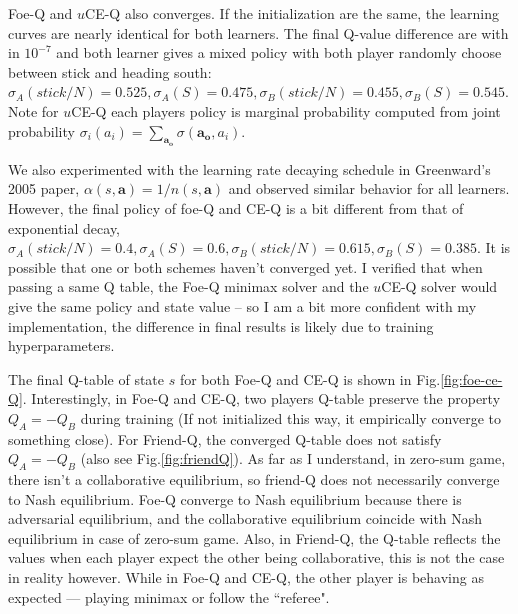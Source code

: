 \documentclass[conference]{IEEEtran}
\begin{document}
Foe-Q and $u$CE-Q also converges. If the initialization are the same, the learning curves are nearly identical for both learners. The final Q-value difference are with in $10^{-7}$ and both learner gives a mixed policy with both player randomly choose between stick and heading south: $\sigma_A(stick/N)=0.525, \sigma_A(S)=0.475, \sigma_B(stick/N)=0.455, \sigma_B(S)=0.545$. Note for $u$CE-Q each players policy is  marginal probability computed from joint probability $\sigma_i(a_i) = \sum_{\mathbf{a_o}}\sigma(\mathbf{a_o}, a_i)$.

We also experimented with the learning rate decaying schedule in Greenward's 2005 paper, $\alpha(s,\mathbf{a}) = 1/n(s,\mathbf{a})$ and observed similar behavior for all learners. However, the final policy of foe-Q and CE-Q is a bit different from that of exponential decay, $\sigma_A(stick/N)=0.4, \sigma_A(S)=0.6, \sigma_B(stick/N)=0.615, \sigma_B(S)=0.385$. It is possible that one or both schemes haven't converged yet. I verified that when passing a same Q table, the Foe-Q minimax solver and the $u$CE-Q solver would give the same policy and state value -- so I am a bit more confident with my implementation, the difference in final results is likely due to training hyperparameters.

The final Q-table of state $s$ for both Foe-Q and CE-Q is shown in Fig.\ref{fig:foe-ce-Q}. Interestingly, in Foe-Q and CE-Q, two players Q-table preserve the property $Q_A = -Q_B$ during training (If not initialized this way, it empirically converge to something close). For Friend-Q, the converged Q-table does not satisfy $Q_A = -Q_B$ (also see Fig.\ref{fig:friendQ}). As far as I understand, in zero-sum game, there isn't a collaborative equilibrium, so friend-Q does not necessarily converge to Nash equilibrium. Foe-Q converge to Nash equilibrium because there is adversarial equilibrium, and the collaborative equilibrium coincide with Nash equilibrium in case of zero-sum game. Also, in Friend-Q, the Q-table reflects the values when each player expect the other being collaborative, this is not the case in reality however. While in Foe-Q and CE-Q, the other player is behaving as expected --- playing minimax or follow the ``referee".
\end{document}
